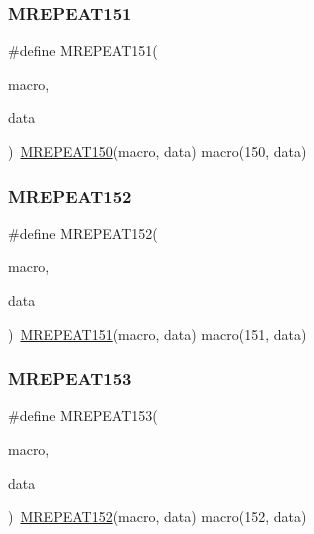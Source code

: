 \mbox{\label{group__group__sam0__utils__mrepeat_gad53956dd011ee41e4542fc564f2102f0}} 
\subsubsection{\texorpdfstring{MREPEAT151}{MREPEAT151}}
{\footnotesize\ttfamily \#define M\+R\+E\+P\+E\+A\+T151(\begin{DoxyParamCaption}\item[{}]{macro,  }\item[{}]{data }\end{DoxyParamCaption})~\mbox{\hyperlink{group__group__sam0__utils__mrepeat_ga4b6a38c831a6d78f44cc9348c496dc5a}{M\+R\+E\+P\+E\+A\+T150}}(macro, data)   macro(150, data)}

\mbox{\label{group__group__sam0__utils__mrepeat_ga6426d25194d019d1aaeca1448aeba07d}} 
\subsubsection{\texorpdfstring{MREPEAT152}{MREPEAT152}}
{\footnotesize\ttfamily \#define M\+R\+E\+P\+E\+A\+T152(\begin{DoxyParamCaption}\item[{}]{macro,  }\item[{}]{data }\end{DoxyParamCaption})~\mbox{\hyperlink{group__group__sam0__utils__mrepeat_gad53956dd011ee41e4542fc564f2102f0}{M\+R\+E\+P\+E\+A\+T151}}(macro, data)   macro(151, data)}

\mbox{\label{group__group__sam0__utils__mrepeat_gac8eb62a598002e65a7aee5ffce9daefb}} 
\subsubsection{\texorpdfstring{MREPEAT153}{MREPEAT153}}
{\footnotesize\ttfamily \#define M\+R\+E\+P\+E\+A\+T153(\begin{DoxyParamCaption}\item[{}]{macro,  }\item[{}]{data }\end{DoxyParamCaption})~\mbox{\hyperlink{group__group__sam0__utils__mrepeat_ga6426d25194d019d1aaeca1448aeba07d}{M\+R\+E\+P\+E\+A\+T152}}(macro, data)   macro(152, data)}

